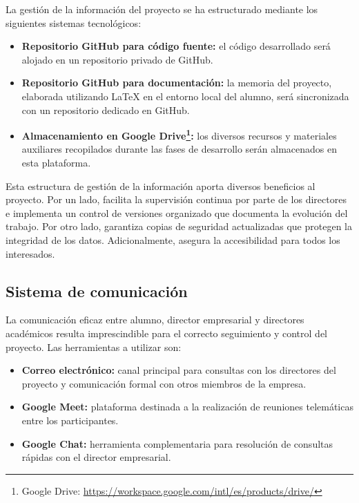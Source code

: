 La gestión de la información del proyecto se ha estructurado mediante los siguientes sistemas tecnológicos:
\begin{itemize}
\item \textbf{Repositorio GitHub para código fuente:} el código desarrollado será alojado en un repositorio privado de GitHub.
\item \textbf{Repositorio GitHub para documentación:} la memoria del proyecto, elaborada utilizando LaTeX en el entorno local del alumno, será sincronizada con un repositorio dedicado en GitHub.
\item \textbf{Almacenamiento en Google Drive\footnote{Google Drive: \url{https://workspace.google.com/intl/es/products/drive/}}:} los diversos recursos y materiales auxiliares recopilados durante las fases de desarrollo serán almacenados en esta plataforma.
\end{itemize}
Esta estructura de gestión de la información aporta diversos beneficios al proyecto. Por un lado, facilita la supervisión continua por parte de los directores e implementa un control de versiones organizado que documenta la evolución del trabajo. Por otro lado, garantiza copias de seguridad actualizadas que protegen la integridad de los datos. Adicionalmente, asegura la accesibilidad para todos los interesados.


\subsection{Sistema de comunicación}
La comunicación eficaz entre alumno, director empresarial y directores académicos resulta imprescindible para el correcto seguimiento y control del proyecto. Las herramientas a utilizar son:
\begin{itemize}
\item\textbf{Correo electrónico: }canal principal para consultas con los directores del proyecto y comunicación formal con otros miembros de la empresa.
\item\textbf{Google Meet: }plataforma destinada a la realización de reuniones telemáticas entre los participantes.
\item\textbf{Google Chat: }herramienta complementaria para resolución de consultas rápidas con el director empresarial.
\end{itemize}

